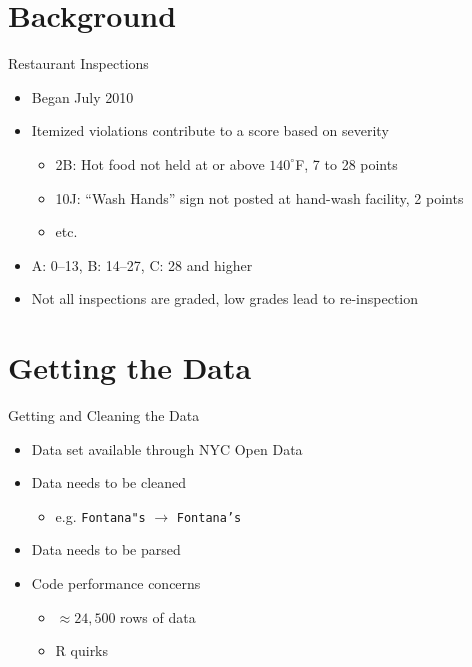 \documentclass[12pt]{beamer}
\begin{document}
\section{Background}
\begin{frame}{Restaurant Inspections}
\begin{itemize}
	\vfill
	\item Began July 2010
	\vfill
	\item Itemized violations contribute to a score based on severity
	\begin{itemize}
		\item 2B: Hot food not held at or above $140^{\circ}$F, 7 to 28 points
		\item 10J: ``Wash Hands'' sign not posted at hand-wash facility, 2 points
		\item etc. 
	\end{itemize}
	\vfill
	\item A: 0--13, B: 14--27, C: 28 and higher
	\vfill
	\item Not all inspections are graded, low grades lead to re-inspection
	\vfill
\end{itemize}
\end{frame}

\section{Getting the Data}
\begin{frame}{Getting and Cleaning the Data}
\begin{itemize}
	\vfill
	\item Data set available through NYC Open Data
	\vfill
	\item Data needs to be cleaned
	\begin{itemize}
		\item e.g. \texttt{Fontana"s} $\rightarrow$ \texttt{Fontana's}
	\end{itemize}
	\vfill
	\item Data needs to be parsed
	\vfill
	\item Code performance concerns
	\begin{itemize}
		\item $\approx24,500$ rows of data
		\item R quirks
	\end{itemize}
	\vfill
\end{itemize}
\end{frame}
\end{document}
